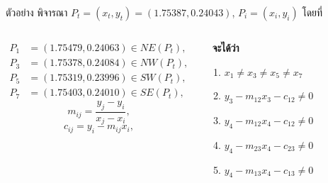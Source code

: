 \documentclass[12pt,aspectratio=169]{beamer}
\begin{document}
\begin{frame}{ตัวอย่าง}
พิจารณา $P_t = (x_t,y_t) =  (1.75387, 0.24043)$, $P_i = (x_i, y_i)$ โดยที่
\begin{columns}
\begin{align*}
P_1 & = (1.75479, 0.24063) \in NE(P_t), \\ 
P_3 & = (1.75378, 0.24084) \in NW(P_t),\\
P_5 & = (1.75319, 0.23996) \in SW(P_t),\\
P_7 & = (1.75403, 0.24010)  \in SE(P_t), 
\end{align*}
\[m_{ij} = \dfrac{y_j-y_i}{x_j-x_i}, \]
\[c_{ij} = y_i - m_{ij}x_i,\]    
\begin{block}{}\
\textbf{จะได้ว่า} 
\begin{enumerate}
    \item $x_1 \neq x_3 \neq x_5 \neq x_7$
    \item $y_3 - m_{12}x_3 - c_{12} \neq 0$
    \item $y_4 - m_{12}x_4 - c_{12} \neq 0$
    \item $y_4 - m_{23}x_4 - c_{23} \neq 0$
    \item $y_4 - m_{13}x_4 - c_{13} \neq 0$
\end{enumerate}     
\end{block} 
\end{columns}


\end{frame}
\end{document}
